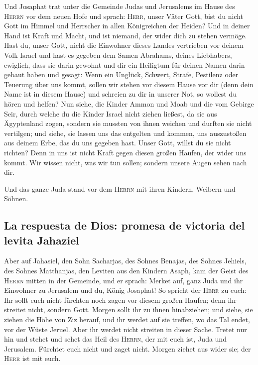  Und Josaphat trat unter die Gemeinde Judas und Jerusalems
im Hause des \textsc{Herrn} vor dem neuen Hofe  und
sprach: \textsc{Herr}, unser Väter Gott, bist du nicht Gott im Himmel
und Herrscher in allen Königreichen der Heiden? Und in deiner Hand ist
Kraft und Macht, und ist niemand, der wider dich zu stehen vermöge.
 Hast du, unser Gott, nicht die Einwohner dieses Landes
vertrieben vor deinem Volk Israel und hast es gegeben dem Samen
Abrahams, deines Liebhabers, ewiglich,  dass sie darin
gewohnt und dir ein Heiligtum für deinen Namen darin gebaut haben und
gesagt:  Wenn ein Unglück, Schwert, Strafe, Pestilenz oder
Teuerung über uns kommt, sollen wir stehen vor diesem Hause vor dir
(denn dein Name ist in diesem Hause) und schreien zu dir in unserer Not,
so wollest du hören und helfen?  Nun siehe, die Kinder
Ammon und Moab und die vom Gebirge Seir, durch welche du die Kinder
Israel nicht ziehen ließest, da sie aus Ägyptenland zogen, sondern sie
mussten von ihnen weichen und durften sie nicht vertilgen;
 und siehe, sie lassen uns das entgelten und kommen, uns
auszustoßen aus deinem Erbe, das du uns gegeben hast. 
Unser Gott, willst du sie nicht richten? Denn in uns ist nicht Kraft
gegen diesen großen Haufen, der wider uns kommt. Wir wissen nicht, was
wir tun sollen; sondern unsere Augen sehen nach dir.

 Und das ganze Juda stand vor dem \textsc{Herrn} mit
ihren Kindern, Weibern und Söhnen.

\hypertarget{la-respuesta-de-dios-promesa-de-victoria-del-levita-jahaziel}{%
\subsection{La respuesta de Dios: promesa de victoria del levita
Jahaziel}\label{la-respuesta-de-dios-promesa-de-victoria-del-levita-jahaziel}}

 Aber auf Jahasiel, den Sohn Sacharjas, des Sohnes
Benajas, des Sohnes Jehiels, des Sohnes Matthanjas, den Leviten aus den
Kindern Asaph, kam der Geist des \textsc{Herrn} mitten in der Gemeinde,
 und er sprach: Merket auf, ganz Juda und ihr Einwohner
zu Jerusalem und du, König Josaphat! So spricht der \textsc{Herr} zu
euch: Ihr sollt euch nicht fürchten noch zagen vor diesem großen Haufen;
denn ihr streitet nicht, sondern Gott.  Morgen sollt ihr
zu ihnen hinabziehen; und siehe, sie ziehen die Höhe von Ziz herauf, und
ihr werdet auf sie treffen, wo das Tal endet, vor der Wüste Jeruel.
 Aber ihr werdet nicht streiten in dieser Sache. Tretet
nur hin und stehet und sehet das Heil des \textsc{Herrn}, der mit euch
ist, Juda und Jerusalem. Fürchtet euch nicht und zaget nicht. Morgen
ziehet aus wider sie; der \textsc{Herr} ist mit euch.

